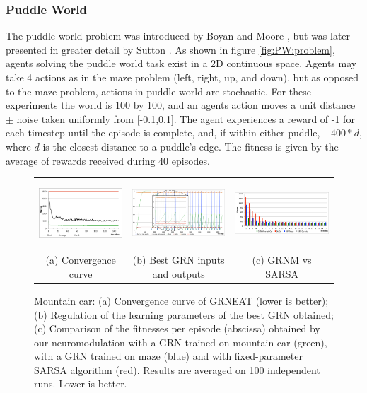 
\subsubsection{Puddle World}

The puddle world problem was introduced by Boyan and Moore \cite{Boyan1995}, but was later presented in greater detail by Sutton \cite{sutton1996generalization}. As shown in figure \ref{fig:PW:problem}, agents solving the puddle world task exist in a 2D continuous space. Agents may take 4 actions as in the maze problem (left, right, up, and down), but as opposed to the maze problem, actions in puddle world are stochastic. For these experiments the world is 100 by 100, and an agents action moves a unit distance $\pm$ noise taken uniformly from [-0.1,0.1]. The agent experiences a reward of -1 for each timestep until the episode is complete, and, if within either puddle, $-400*d$, where $d$ is the closest distance to a puddle's edge. The fitness is given by the average of rewards received during 40 episodes.


\begin{figure}[t!]
\center
\begin{tabular}{ccc}
\includegraphics[height=2.5cm]{MC_convergence.pdf} &
\includegraphics[height=2.5cm]{MC_GRNBehavior.pdf} &
\includegraphics[height=2.5cm]{MC_GRNvsSARSA.pdf}\\
(a) Convergence curve &
(b) Best GRN inputs and outputs &
(c) GRNM vs SARSA
\end{tabular}
\caption{Mountain car: (a) Convergence curve of GRNEAT (lower is better); (b) Regulation of the learning parameters of the best GRN obtained; (c) Comparison of the fitnesses per episode (abscissa) obtained by our neuromodulation with a GRN trained on mountain car (green), with a GRN trained on maze (blue) and with fixed-parameter SARSA algorithm (red). Results are averaged on 100 independent runs. Lower is better.}\label{fig:MC:Results}
\end{figure}

